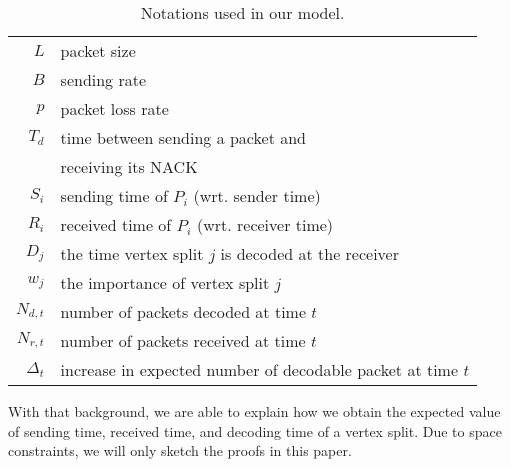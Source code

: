     \begin{table}
    \begin{centering}
    \begin{tabular}{|r|l|}
    \hline
    $L$ & packet size \\
    $B$ & sending rate \\
    $p$ & packet loss rate \\
    $T_d$ & time between sending a packet and \\
          & receiving its NACK\\
    $S_i$ & sending time of $P_i$ (wrt. sender time)\\
    $R_i$ & received time of $P_i$ (wrt. receiver time)\\
    $D_j$ & the time vertex split $j$ is decoded at the receiver \\
    $w_j$ & the importance of vertex split $j$ \\
    $N_{d,t}$ & number of packets decoded at time $t$ \\
    $N_{r,t}$ & number of packets received at time $t$ \\
    $\Delta_t$ & increase in expected number of decodable packet at time $t$\\
    \hline
    \end{tabular}
    \caption{Notations used in our model\label{t:model:notation}.}
    \end{centering}
    \end{table}

    With that background, we are able to explain how we obtain the
    expected value of sending time, received time, and decoding time
    of a vertex split.
\if{}
    Due to space constraints, we will only sketch the proofs in this
    paper.
\fi

